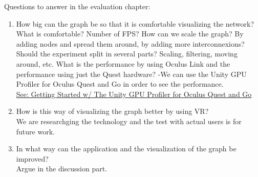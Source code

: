 Questions to answer in the evaluation chapter:

\begin{enumerate}
  \item{How big can the graph be so that it is comfortable visualizing the network?}\\
  What is comfortable? Number of FPS?
  How can we scale the graph? By adding nodes and spread them around, by adding more interconnexions?
  Should the experiment split in several parts? Scaling, filtering, moving around, etc.
  What is the performance by using Oculus Link and the performance using just the Quest hardware?
  -We can use the Unity GPU Profiler for Oculus Quest and Go in order to see the performance.\\
  \href{https://developer.oculus.com/blog/getting-started-w-the-unity-gpu-profiler-for-oculus-quest-and-go/}{See: Getting Started w/ The Unity GPU Profiler for Oculus Quest and Go}
  \item{How is this way of visualizing the graph better by using VR?}\\
  We are researchging the technology and the test with actual users is for future work.
  \item{In what way can the application and the visualization of the graph be improved?}\\
  Argue in the discussion part.
\end{enumerate}
